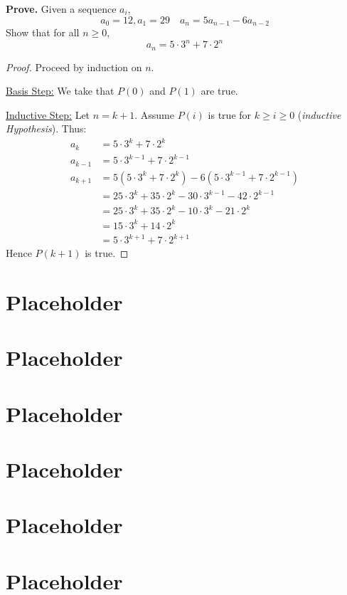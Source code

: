 \documentclass[a4paper]{article}
\begin{document}
  \textbf{Prove.} Given a sequence $a_i$, 
  \[
    a_0 = 12, a_1 = 29 \quad a_n = 5a_{n-1} - 6a_{n-2}
  \]
  Show that for all $n \geq 0$,
  \[
    a_n = 5 \cdot 3^n + 7 \cdot 2^n
  \]
  \begin{proof}
    Proceed by induction on $n$.

    \underline{Basis Step:} We take that $P(0)$ and $P(1)$ are true.
    
    \underline{Inductive Step:} Let $n=k+1$. Assume $P(i)$ is true for $k \geq i \geq 0$ (\textit{inductive Hypothesis}). Thus:
    \begin{displaymath}
      \begin{split}
        a_k &= 5 \cdot 3^k + 7 \cdot 2^k \\
        a_{k-1} &= 5 \cdot 3^{k-1} + 7 \cdot 2^{k-1} \\
        a_{k+1} &= 5(5\cdot 3^k + 7\cdot 2^k) - 6(5\cdot 3^{k-1} + 7\cdot 2^{k-1})\\
                &= 25 \cdot 3^k + 35 \cdot 2^k - 30 \cdot 3^{k-1} - 42 \cdot 2^{k-1} \\ 
                &= 25 \cdot 3^k + 35 \cdot 2^k - 10 \cdot 3^k - 21 \cdot 2^k \\ 
                &= 15 \cdot 3^k + 14 \cdot 2^k \\
                &= 5 \cdot 3^{k+1} + 7 \cdot 2^{k+1}
      \end{split}
    \end{displaymath}
    Hence $P(k+1)$ is true.
  \end{proof}
  
  \section{Placeholder} 
  \section{Placeholder} 
  \section{Placeholder} 
  \section{Placeholder} 
  \section{Placeholder} 
  \section{Placeholder} 
\end{document}
